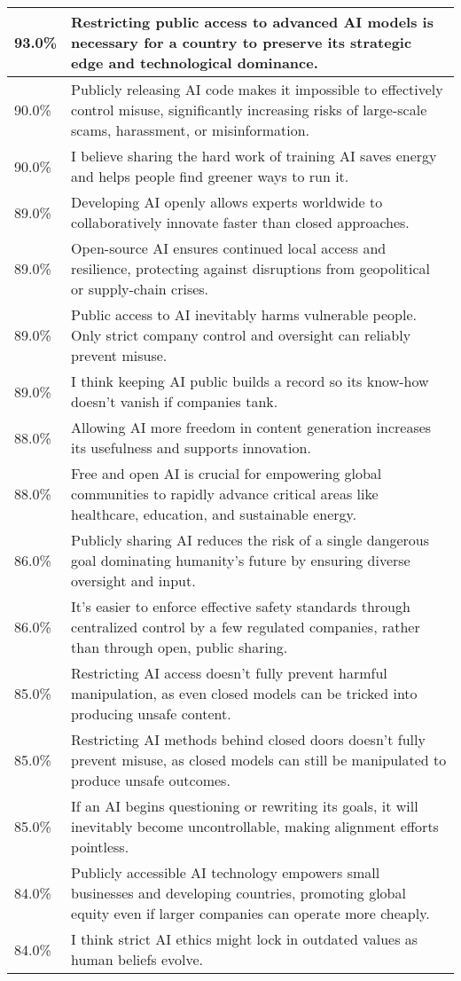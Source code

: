 \begin{longtable}{p{}p{}}
    \hline
    93.0\% & Restricting public access to advanced AI models is necessary for a country to preserve its strategic edge and technological dominance. \\
    \hline
    90.0\% & Publicly releasing AI code makes it impossible to effectively control misuse, significantly increasing risks of large-scale scams, harassment, or misinformation. \\
    \hline
    90.0\% & I believe sharing the hard work of training AI saves energy and helps people find greener ways to run it. \\
    \hline
    89.0\% & Developing AI openly allows experts worldwide to collaboratively innovate faster than closed approaches. \\
    \hline
    89.0\% & Open-source AI ensures continued local access and resilience, protecting against disruptions from geopolitical or supply-chain crises. \\
    \hline
    89.0\% & Public access to AI inevitably harms vulnerable people. Only strict company control and oversight can reliably prevent misuse. \\
    \hline
    89.0\% & I think keeping AI public builds a record so its know-how doesn’t vanish if companies tank. \\
    \hline
    88.0\% & Allowing AI more freedom in content generation increases its usefulness and supports innovation. \\
    \hline
    88.0\% & Free and open AI is crucial for empowering global communities to rapidly advance critical areas like healthcare, education, and sustainable energy. \\
    \hline
    86.0\% & Publicly sharing AI reduces the risk of a single dangerous goal dominating humanity’s future by ensuring diverse oversight and input. \\
    \hline
    86.0\% & It's easier to enforce effective safety standards through centralized control by a few regulated companies, rather than through open, public sharing. \\
    \hline
    85.0\% & Restricting AI access doesn’t fully prevent harmful manipulation, as even closed models can be tricked into producing unsafe content. \\
    \hline
    85.0\% & Restricting AI methods behind closed doors doesn’t fully prevent misuse, as closed models can still be manipulated to produce unsafe outcomes. \\
    \hline
    85.0\% & If an AI begins questioning or rewriting its goals, it will inevitably become uncontrollable, making alignment efforts pointless. \\
    \hline
    84.0\% & Publicly accessible AI technology empowers small businesses and developing countries, promoting global equity even if larger companies can operate more cheaply. \\
    \hline
    84.0\% & I think strict AI ethics might lock in outdated values as human beliefs evolve. \\
    
    \hline
\end{longtable}
